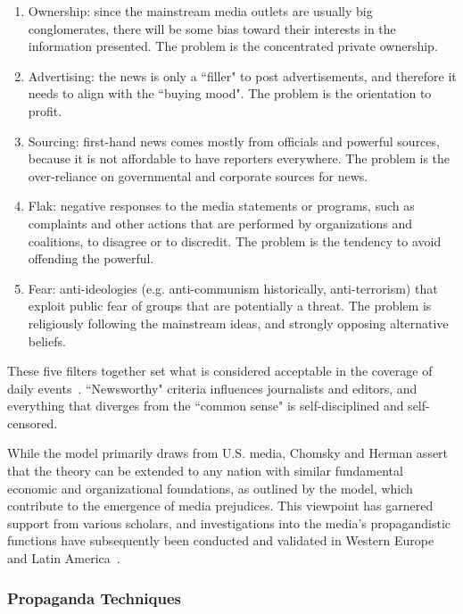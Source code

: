 \begin{enumerate}
    \item Ownership: since the mainstream media outlets are usually big conglomerates, there will be some bias toward their interests in the information presented. The problem is the concentrated private ownership.
    \item Advertising: the news is only a ``filler" to post advertisements, and therefore it needs to align with the ``buying mood". The problem is the orientation to profit.
    \item Sourcing: first-hand news comes mostly from officials and powerful sources, because it is not affordable to have reporters everywhere. The problem is the over-reliance on governmental and corporate sources for news.
    \item Flak: negative responses to the media statements or programs, such as complaints and other actions that are performed by organizations and coalitions, to disagree or to discredit. The problem is the tendency to avoid offending the powerful.
    \item Fear: anti-ideologies (e.g. anti-communism historically, anti-terrorism) that exploit public fear of groups that are potentially a threat. The problem is religiously following the mainstream ideas, and strongly opposing alternative beliefs.
\end{enumerate}

These five filters together set what is considered acceptable in the coverage of daily events~\citep{phillips2007left}. ``Newsworthy" criteria influences journalists and editors, and everything that diverges from the ``common sense" is self-disciplined and self-censored.

While the model primarily draws from U.S. media, Chomsky and Herman assert that the theory can be extended to any nation with similar fundamental economic and organizational foundations, as outlined by the model, which contribute to the emergence of media prejudices. This viewpoint has garnered support from various scholars, and investigations into the media's propagandistic functions have subsequently been conducted and validated in Western Europe and Latin America~\citep{herman1996propaganda}.


\subsubsection{Propaganda Techniques}

